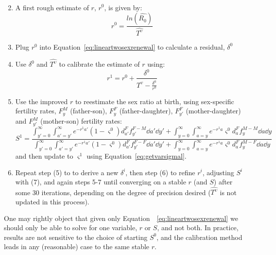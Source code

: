 \begin{enumerate}
\begin{equation}
\begin{split}
 \end{split}
 \end{equation}
  \item A first rough estimate of $r$, $r^0$, is given by:
   \begin{equation}
   r^0 = \frac{ln(\widehat{R_0})}{\widehat{T^\upsilon}}
   \end{equation}
  \item Plug $r^0$ into Equation~\eqref{eq:lineartwosexrenewal} to calculate a
  residual, $\delta^0$
  \item Use $\delta^0$ and $\widehat{T^\upsilon}$ to calibrate the estimate of $r$
  using:
  \begin{equation}
  r^{1} = r^0 + \frac{\delta^0}{\widehat{T^\upsilon} - \frac{\delta^0}{r^0}}
  \end{equation}
  \item  Use the improved $r$ to reestimate the sex ratio at birth, using
  sex-specific fertility rates, $F_y^M$ (father-son), $F_y^F$
  (father-daughter), $F_{y'}^F$ (mother-daughter) and $F_{y'}^M$ (mother-son)
  fertility rates:
  \begin{equation}
  S^1 = \frac{ \int _{y'=0}^\infty \int _{a'=y'}^\infty e^{-r^1a'}
                      (1-\varsigma^0)d_{a'}^F f_{y'}^{F-M} \dd a' \dd y' + \int
                      _{y=0}^\infty \int _{a=y}^\infty e^{-r^1a}
                      \varsigma^0 d_{a}^F f_{y}^{M-M} \dd a \dd y}{\int
                      _{y'=0}^\infty \int _{a'=y'}^\infty e^{-r^1a'}
                      (1-\varsigma^0)d_{a'}^F f_{y'}^{F-F} \dd a' \dd y' + \int
                      _{y=0}^\infty \int _{a=y}^\infty e^{-r^1a} \varsigma^0
                      d_{a}^F f_{y}^{M-F} \dd a \dd y}
  \end{equation}
  and then update to $\varsigma^1$ using Equation~\eqref{eq:getvarsigmal}.
  \item Repeat step (5) to to derive a new $\delta^i$, then step (6) to refine
  $r^i$, adjusting $S^i$ with (7), and again steps 5-7 until converging on a
  stable $r$ (and $S$) after some 30 iterations, depending on the degree of
  precision desired ($\widehat{T^\upsilon}$ is not updated in this process).
\end{enumerate}
  One may rightly object that given only
  Equation~~\eqref{eq:lineartwosexrenewal} we should only be able to
  solve for one variable, $r$ or $S$, and not both. In practice, results are
  not sensitive to the choice of starting $S^0$, and the
  calibration method leads in any (reasonable) case to the same stable $r$.

